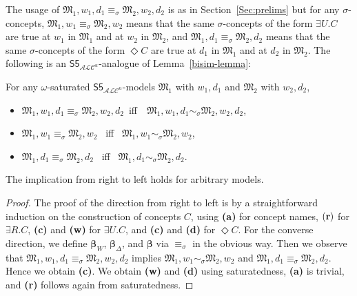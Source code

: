 \documentclass{lmcs} %
\theoremstyle{plain}\newtheorem{satz}[thm]{Satz} %
\newcommand{\bs}{\boldsymbol{\beta}}
\newcommand{\ALCIOS}{\ensuremath{\mathsf{S5}_{\mathcal{ALC}^u}}}
\begin{document}
The usage of $\mathfrak{M}_{1},w_{1},d_{1} \equiv_{\sigma} \mathfrak{M}_{2},w_{2},d_{2}$
is as in Section~\ref{Sec:prelims} but for any $\sigma$-concepts,
$\mathfrak{M}_{1},w_{1}\equiv_{\sigma} \mathfrak{M}_{2},w_{2}$ means that the same $\sigma$-concepts of the form  $\exists U.C$ are true at $w_1$ in $\mathfrak M_1$ and at $w_2$ in $\mathfrak M_2$, 
and $\mathfrak{M}_{1},d_{1}\equiv_{\sigma} \mathfrak{M}_{2},d_{2}$ means that the same $\sigma$-concepts of the form  $\Diamond C$ are true at $d_1$ in $\mathfrak M_1$ and at $d_2$ in $\mathfrak M_2$.
%
%
The following is an $\ALCIOS$-analogue of Lemma~\ref{bisim-lemma}: 

\begin{lem}\label{bisim-lemma-ALC}
	For any $\omega$-saturated $\ALCIOS$-models $\mathfrak{M}_{1}$ with $w_1,d_1$ and $\mathfrak{M}_{2}$ with $w_2,d_2$, 
	\begin{itemize}
		\item[--] \mbox{$\mathfrak{M}_{1},w_{1},d_{1}  \equiv_{\sigma}  \mathfrak{M}_{2},w_{2},d_{2}$ iff \ $\mathfrak{M}_{1},w_{1},d_{1}  \sim_{\sigma} \mathfrak{M}_{2},w_{2},d_{2}$},
		
		\item[--] $\mathfrak{M}_{1},w_{1} \equiv_{\sigma} \mathfrak{M}_{2},w_{2}$ \ iff \ $
		\mathfrak{M}_{1},w_{1} \sim_{\sigma} \mathfrak{M}_{2},w_{2}$,
		
		\item[--] $\mathfrak{M}_{1},d_{1}  \equiv_{\sigma} \mathfrak{M}_{2},d_{2}$ \ iff \ $
		\mathfrak{M}_{1},d_{1}  \sim_{\sigma} \mathfrak{M}_{2},d_{2}$.
	\end{itemize}
	The implication from right to left holds for arbitrary models.
\end{lem}
%
\begin{proof}
	The proof of the direction from right to left is by a straightforward induction on the construction of concepts $C$, using {\bf (a)} for concept names, ${\bf (r)}$ for $\exists R.C$, {\bf (c)} and {\bf (w)} for $\exists U.C$, and {\bf (c)} and {\bf (d)} for $\Diamond C$. 
%	
	For the converse direction, we define $\bs_{W}$, $\bs_{\Delta}$, and $\bs$ via $\equiv_{\sigma}$ in the obvious way. Then we observe that 
	$\mathfrak{M}_{1},w_{1},d_{1}  \equiv_{\sigma} \mathfrak{M}_{2},w_{2},d_{2}$ implies $\mathfrak{M}_{1},w_{1} \sim_{\sigma} \mathfrak{M}_{2},w_{2}$ and
	$\mathfrak{M}_{1},d_{1}  \equiv_{\sigma} \mathfrak{M}_{2},d_{2}$. Hence we obtain {\bf (c)}. We obtain {\bf (w)} and {\bf (d)} using saturatedness, {\bf (a)} is trivial, and {\bf (r)} follows again from saturatedness.
\end{proof}
\end{document}
